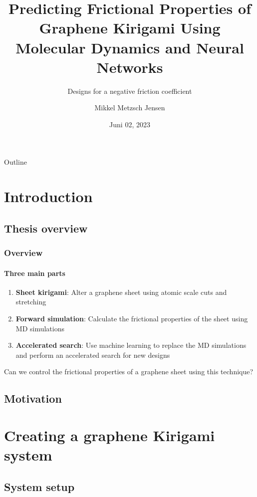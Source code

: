 \documentclass[UKenglish]{beamer}
\author[Mikkel Metzsch Jensen]{Mikkel Metzsch Jensen}
\title[Predicting Graphene Kirigami Friction]{Predicting Frictional Properties of Graphene Kirigami Using Molecular Dynamics and Neural Networks}
\subtitle{Designs for a negative friction coefficient}
\institute[UiO]{University of Oslo}
\date[Juni 02, 2023]{Juni 02, 2023}
\begin{document}
\begin{frame}{Outline}
    \tableofcontents
\end{frame}


\section{Introduction} %
\subsection{Thesis overview}

\begin{frame}[c]
	\frametitle{Overview}
	\framesubtitle{Three main parts}
	
	\begin{enumerate}
		\setlength\itemsep{1em}
		\item \textbf{Sheet kirigami}: Alter a graphene sheet using atomic scale cuts and stretching
		\item \textbf{Forward simulation}: Calculate the frictional properties of the sheet using MD simulations
		\item \textbf{Accelerated search}: Use machine learning to replace the MD simulations and perform an accelerated search for new designs
	\end{enumerate}
	\vspace{2mm}
	
	Can we control the frictional properties of a graphene sheet using this technique?
	
\end{frame}


\subsection{Motivation}




\section{Creating a graphene Kirigami system} %
\subsection{System setup}
\end{document}
